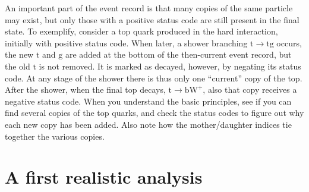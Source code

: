 \documentclass[12pt,a4paper]{article}
\renewcommand{\b}{{\mathrm b}}
\newcommand{\g}{{\mathrm g}}
\renewcommand{\t}{{\mathrm t}}
\newcommand{\W}{{\mathrm W}}
\begin{document}
An important part of the event record is that many copies of the same
particle may exist, but only those with a positive status code are still
present in the final state. To exemplify, consider a top quark
produced in the hard interaction, initially with positive status code. When
later, a shower branching $\t \to \t \g$ occurs, the new $\t$ and $\g$ are
added at the bottom of the then-current event record, but the old $\t$ is
not removed. It is marked as decayed, however, by negating its status code.
At any stage of the shower there is thus only one ``current'' copy of the
top. After the shower, when the final top decays, $\t \to \b \W^+$, also
that copy receives a negative status code. When you understand the basic
principles, see if you can find several copies of the top quarks, and check
the status codes to figure out why each new copy has been added. Also note
how the mother/daughter indices tie together the various copies.

\section{A first realistic analysis}
\end{document}
